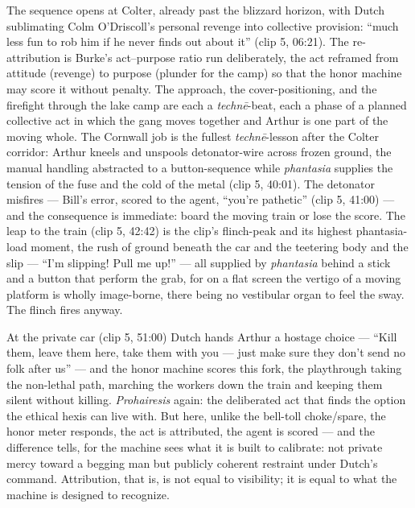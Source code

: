 The sequence opens at Colter, already past the blizzard horizon, with Dutch sublimating Colm O'Driscoll's personal revenge into collective provision: ``much less fun to rob him if he never finds out about it'' (clip 5, 06:21). The re-attribution is Burke's act–purpose ratio run deliberately, the act reframed from attitude (revenge) to purpose (plunder for the camp) so that the honor machine may score it without penalty. The approach, the cover-positioning, and the firefight through the lake camp are each a \textit{technē}-beat, each a phase of a planned collective act in which the gang moves together and Arthur is one part of the moving whole. The Cornwall job is the fullest \textit{technē}-lesson after the Colter corridor: Arthur kneels and unspools detonator-wire across frozen ground, the manual handling abstracted to a button-sequence while \textit{phantasia} supplies the tension of the fuse and the cold of the metal (clip 5, 40:01). The detonator misfires — Bill's error, scored to the agent, ``you're pathetic'' (clip 5, 41:00) — and the consequence is immediate: board the moving train or lose the score. The leap to the train (clip 5, 42:42) is the clip's flinch-peak and its highest phantasia-load moment, the rush of ground beneath the car and the teetering body and the slip — ``I'm slipping! Pull me up!'' — all supplied by \textit{phantasia} behind a stick and a button that perform the grab, for on a flat screen the vertigo of a moving platform is wholly image-borne, there being no vestibular organ to feel the sway. The flinch fires anyway.

At the private car (clip 5, 51:00) Dutch hands Arthur a hostage choice — ``Kill them, leave them here, take them with you — just make sure they don't send no folk after us'' — and the honor machine scores this fork, the playthrough taking the non-lethal path, marching the workers down the train and keeping them silent without killing. \textit{Prohairesis} again: the deliberated act that finds the option the ethical hexis can live with. But here, unlike the bell-toll choke/spare, the honor meter responds, the act is attributed, the agent is scored — and the difference tells, for the machine sees what it is built to calibrate: not private mercy toward a begging man but publicly coherent restraint under Dutch's command. Attribution, that is, is not equal to visibility; it is equal to what the machine is designed to recognize.

